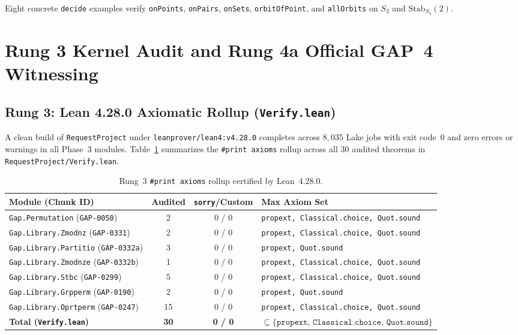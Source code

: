 \documentclass[11pt,a4paper]{article}
\begin{document}
Eight concrete \texttt{decide} examples verify \texttt{onPoints}, \texttt{onPairs}, \texttt{onSets}, \texttt{orbitOfPoint}, and \texttt{allOrbits} on $S_3$ and $\mathrm{Stab}_{S_3}(2)$.

\section{Rung 3 Kernel Audit and Rung 4a Official GAP~4 Witnessing}
\label{sec:audit}

\subsection{Rung 3: Lean 4.28.0 Axiomatic Rollup (\texttt{Verify.lean})}
A clean build of \texttt{RequestProject} under \texttt{leanprover/lean4:v4.28.0} completes across $8{,}035$ Lake jobs with exit code~$0$ and zero errors or warnings in all Phase~3 modules. Table~\ref{tab:audit} summarizes the \texttt{\#print axioms} rollup across all $30$ audited theorems in \texttt{RequestProject/Verify.lean}.

\begin{table}[h!]
\centering
\small
\footnotesize
\begin{tabularx}{\textwidth}{@{}X c c l@{}}
\toprule
\textbf{Module (Chunk ID)} & \textbf{Audited} & \textbf{\texttt{sorry}/Custom} & \textbf{Max Axiom Set} \\
\midrule
\texttt{Gap.Permutation} (\texttt{GAP-0050}) & 2 & 0 / 0 & \texttt{propext, Classical.choice, Quot.sound} \\
\texttt{Gap.Library.Zmodnz} (\texttt{GAP-0331}) & 2 & 0 / 0 & \texttt{propext, Classical.choice, Quot.sound} \\
\texttt{Gap.Library.Partitio} (\texttt{GAP-0332a}) & 3 & 0 / 0 & \texttt{propext, Quot.sound} \\
\texttt{Gap.Library.Zmodnze} (\texttt{GAP-0332b}) & 1 & 0 / 0 & \texttt{propext, Classical.choice, Quot.sound} \\
\texttt{Gap.Library.Stbc} (\texttt{GAP-0299}) & 5 & 0 / 0 & \texttt{propext, Classical.choice, Quot.sound} \\
\texttt{Gap.Library.Grpperm} (\texttt{GAP-0190}) & 2 & 0 / 0 & \texttt{propext, Quot.sound} \\
\texttt{Gap.Library.Oprtperm} (\texttt{GAP-0247}) & 15 & 0 / 0 & \texttt{propext, Classical.choice, Quot.sound} \\
\midrule
\textbf{Total (\texttt{Verify.lean})} & \textbf{30} & \textbf{0 / 0} & $\subseteq \{\texttt{propext, Classical.choice, Quot.sound}\}$ \\
\bottomrule
\end{tabularx}
\caption{Rung~3 \texttt{\#print axioms} rollup certified by Lean~4.28.0.}
\label{tab:audit}
\end{table}
\end{document}
